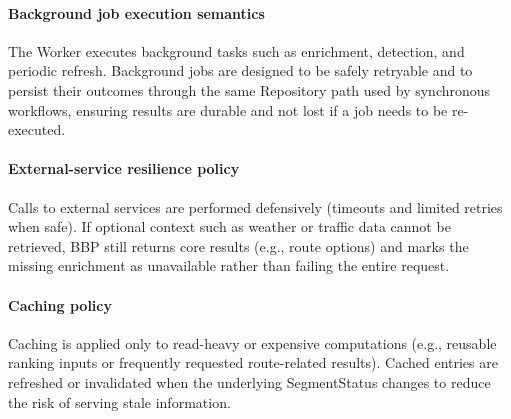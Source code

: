 \paragraph{Background job execution semantics}
The Worker executes background tasks such as enrichment, detection, and periodic refresh. Background jobs are designed to be safely retryable and to persist their outcomes through the same Repository path used by synchronous workflows, ensuring results are durable and not lost if a job needs to be re-executed.

\paragraph{External-service resilience policy}
Calls to external services are performed defensively (timeouts and limited retries when safe). If optional context such as weather or traffic data cannot be retrieved, BBP still returns core results (e.g., route options) and marks the missing enrichment as unavailable rather than failing the entire request.

\paragraph{Caching policy}
Caching is applied only to read-heavy or expensive computations (e.g., reusable ranking inputs or frequently requested route-related results). Cached entries are refreshed or invalidated when the underlying SegmentStatus changes to reduce the risk of serving stale information.
